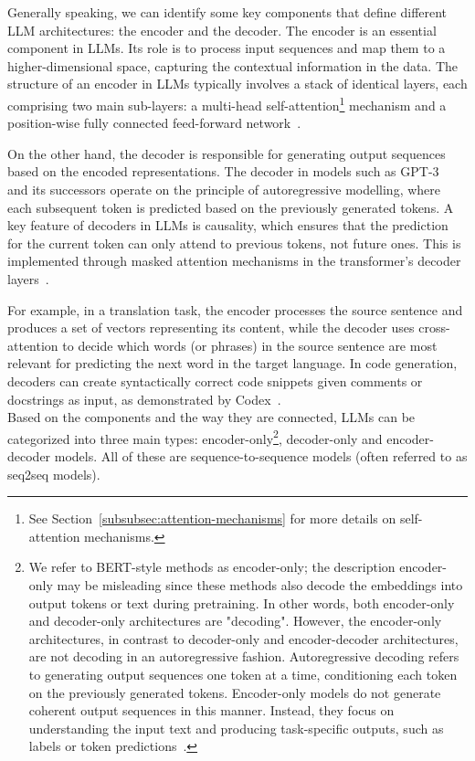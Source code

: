 Generally speaking, we can identify some key components that define different LLM architectures: the encoder and the decoder.
The encoder is an essential component in LLMs. Its role is to process input sequences and map them to a higher-dimensional space, capturing the contextual information in the data.
The structure of an encoder in LLMs typically involves a stack of identical layers, each comprising two main sub-layers: a multi-head self-attention\footnote{See Section~\ref{subsubsec:attention-mechanisms} for more details on self-attention mechanisms.} mechanism and a position-wise fully connected feed-forward network~\cite{vaswani2023attention}.

On the other hand, the decoder is responsible for generating output sequences based on the encoded representations.
The decoder in models such as GPT-3~\cite{brown2020language} and its successors operate on the principle of autoregressive modelling, where each subsequent token is predicted based on the previously generated tokens.
A key feature of decoders in LLMs is causality, which ensures that the prediction for the current token can only attend to previous tokens, not future ones.
This is implemented through masked attention mechanisms in the transformer's decoder layers~\cite{vaswani2023attention}.

For example, in a translation task, the encoder processes the source sentence and produces a set of vectors representing its content, while the decoder uses cross-attention to decide which words (or phrases) in the source sentence are most relevant for predicting the next word in the target language.
In code generation, decoders can create syntactically correct code snippets given comments or docstrings as input, as demonstrated by Codex~\cite{chen2021evaluating}.\\

Based on the components and the way they are connected, LLMs can be categorized into three main types: encoder-only\footnote{
	We refer to BERT-style methods as encoder-only; the description encoder-only may be misleading since these methods also decode the embeddings into output tokens or text during pretraining.
	In other words, both encoder-only and decoder-only architectures are "decoding". However, the encoder-only architectures, in contrast to decoder-only and encoder-decoder architectures, are not decoding in an autoregressive fashion.
	Autoregressive decoding refers to generating output sequences one token at a time, conditioning each token on the previously generated tokens.
	Encoder-only models do not generate coherent output sequences in this manner.
	Instead, they focus on understanding the input text and producing task-specific outputs, such as labels or token predictions~\cite{raschka2023encoderdecoder}.
},
decoder-only and encoder-decoder models.
All of these are sequence-to-sequence models (often referred to as seq2seq models).


